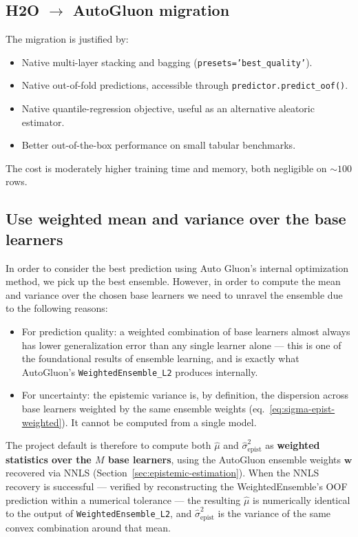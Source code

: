\documentclass[11pt,a4paper]{article}
\begin{document}
\subsection{H2O $\rightarrow$ AutoGluon migration}

\begin{decisionbox}
The migration is justified by:
\begin{itemize}
    \item Native multi-layer stacking and bagging (\texttt{presets='best\_quality'}).
    \item Native out-of-fold predictions, accessible through \texttt{predictor.predict\_oof()}.
    \item Native quantile-regression objective, useful as an alternative aleatoric estimator.
    \item Better out-of-the-box performance on small tabular benchmarks.
\end{itemize}
The cost is moderately higher training time and memory, both negligible on $\sim 100$ rows.
\end{decisionbox}

\subsection{Use weighted mean and variance over the base learners}


In order to consider the best prediction using Auto Gluon's internal optimization method, we pick up the best ensemble. However, in order to compute the mean and variance over the chosen base learners we need to unravel the ensemble due to the following reasons:

\begin{itemize}
    \item For prediction quality: a weighted combination of base learners almost always has lower generalization error than any single learner alone — this is one of the foundational results of ensemble learning, and is exactly what AutoGluon's \texttt{WeightedEnsemble\_L2} produces internally.
    \item For uncertainty: the epistemic variance is, by definition, the dispersion across base learners weighted by the same ensemble weights (eq.~\eqref{eq:sigma-epist-weighted}). It cannot be computed from a single model.
\end{itemize}

The project default is therefore to compute both $\hat\mu$ and $\hat\sigma^2_{\text{epist}}$ as \textbf{weighted statistics over the $M$ base learners}, using the AutoGluon ensemble weights $\bm w$ recovered via NNLS (Section~\ref{sec:epistemic-estimation}). When the NNLS recovery is successful — verified by reconstructing the WeightedEnsemble's OOF prediction within a numerical tolerance — the resulting $\hat\mu$ is numerically identical to the output of \texttt{WeightedEnsemble\_L2}, and $\hat\sigma^2_{\text{epist}}$ is the variance of the same convex combination around that mean.
\end{document}
